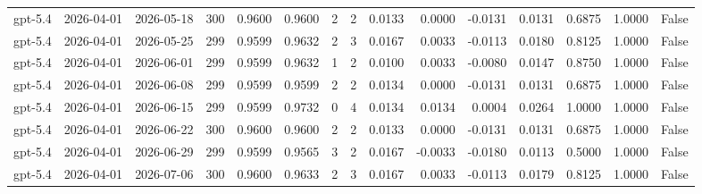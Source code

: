 \begin{table}
\begin{tabular}{lllrrrrrrrrrrrr}
gpt-5.4 & 2026-04-01 & 2026-05-18 & 300 & 0.9600 & 0.9600 & 2 & 2 & 0.0133 & 0.0000 & -0.0131 & 0.0131 & 0.6875 & 1.0000 & False \\
gpt-5.4 & 2026-04-01 & 2026-05-25 & 299 & 0.9599 & 0.9632 & 2 & 3 & 0.0167 & 0.0033 & -0.0113 & 0.0180 & 0.8125 & 1.0000 & False \\
gpt-5.4 & 2026-04-01 & 2026-06-01 & 299 & 0.9599 & 0.9632 & 1 & 2 & 0.0100 & 0.0033 & -0.0080 & 0.0147 & 0.8750 & 1.0000 & False \\
gpt-5.4 & 2026-04-01 & 2026-06-08 & 299 & 0.9599 & 0.9599 & 2 & 2 & 0.0134 & 0.0000 & -0.0131 & 0.0131 & 0.6875 & 1.0000 & False \\
gpt-5.4 & 2026-04-01 & 2026-06-15 & 299 & 0.9599 & 0.9732 & 0 & 4 & 0.0134 & 0.0134 & 0.0004 & 0.0264 & 1.0000 & 1.0000 & False \\
gpt-5.4 & 2026-04-01 & 2026-06-22 & 300 & 0.9600 & 0.9600 & 2 & 2 & 0.0133 & 0.0000 & -0.0131 & 0.0131 & 0.6875 & 1.0000 & False \\
gpt-5.4 & 2026-04-01 & 2026-06-29 & 299 & 0.9599 & 0.9565 & 3 & 2 & 0.0167 & -0.0033 & -0.0180 & 0.0113 & 0.5000 & 1.0000 & False \\
gpt-5.4 & 2026-04-01 & 2026-07-06 & 300 & 0.9600 & 0.9633 & 2 & 3 & 0.0167 & 0.0033 & -0.0113 & 0.0179 & 0.8125 & 1.0000 & False \\
\bottomrule
\end{tabular}
\end{table}
